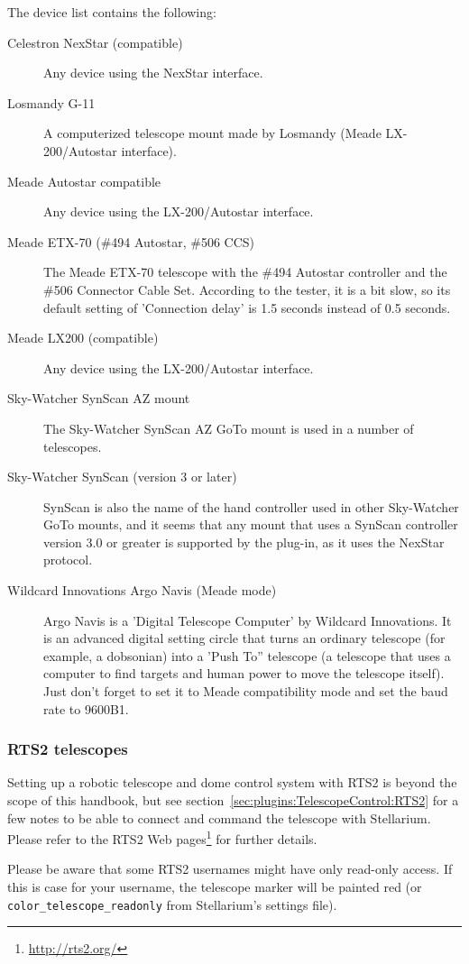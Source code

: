 The device list contains the following:
\begin{description}
\item[Celestron NexStar (compatible)] Any device using the NexStar
  interface.
\item[Losmandy G-11] A computerized telescope mount made by Losmandy
  (Meade LX-200/Autostar interface).
\item[Meade Autostar compatible] Any device using the LX-200/Autostar
  interface.
\item[Meade ETX-70 (\#494 Autostar, \#506 CCS)] The Meade ETX-70
  telescope with the \#494 Autostar controller and the \#506 Connector
  Cable Set. According to the tester, it is a bit slow, so its default
  setting of 'Connection delay' is 1.5 seconds instead of 0.5 seconds.
\item[Meade LX200 (compatible)] Any device using the LX-200/Autostar
  interface.
\item[Sky-Watcher SynScan AZ mount] The Sky-Watcher SynScan AZ GoTo
  mount is used in a number of telescopes.
\item[Sky-Watcher SynScan (version 3 or later)] SynScan is also the
  name of the hand controller used in other Sky-Watcher GoTo mounts,
  and it seems that any mount that uses a SynScan controller version
  3.0 or greater is supported by the plug-in, as it uses the NexStar
  protocol.
\item[Wildcard Innovations Argo Navis (Meade mode)] Argo Navis is a
  'Digital Telescope Computer' by Wildcard Innovations. It is an
  advanced digital setting circle that turns an ordinary telescope
  (for example, a dobsonian) into a 'Push To'' telescope (a telescope
  that uses a computer to find targets and human power to move the
  telescope itself). Just don't forget to set it to Meade
  compatibility mode and set the baud rate to 9600B1.
\end{description}

\subsubsection{RTS2 telescopes}
Setting up a robotic telescope and dome control system with RTS2 
is beyond the scope of this handbook, but see section~\ref{sec:plugins:TelescopeControl:RTS2} 
for a few notes to be able to connect and command the telescope with Stellarium.
Please refer to the RTS2 Web pages\footnote{\url{http://rts2.org/}} for further details.

Please be aware that some RTS2 usernames might have only read-only access. If this is
case for your username, the telescope marker will be painted red (or
\texttt{color\_telescope\_readonly} from Stellarium's settings file).

